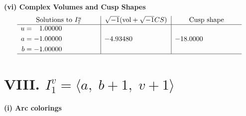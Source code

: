 \documentclass[1p]{elsarticle_modified}
\theoremstyle{definition}
\newcommand{\I}{\sqrt{-1}}
\begin{document}
\newpage\flushleft \textbf{(vi) Complex Volumes and Cusp Shapes}
$$\begin{array}{c|c|c}  
\text{Solutions to }I^u_{7}& \I (\text{vol} + \sqrt{-1}CS) & \text{Cusp shape}\\
 \hline 
\begin{aligned}
u &= \phantom{-}1.00000\phantom{ +0.000000I} \\
a &= -1.00000\phantom{ +0.000000I} \\
b &= -1.00000\phantom{ +0.000000I}\end{aligned}
 & -4.93480\phantom{ +0.000000I} & -18.0000\phantom{ +0.000000I}\\
 \hline 
 \end{array}$$\newpage\newpage\renewcommand{\arraystretch}{1}
\centering \section*{VIII. $I^v_{1}= \langle a,\;b+1,\;v+1 \rangle$}
\flushleft \textbf{(i) Arc colorings}\\
\end{document}

